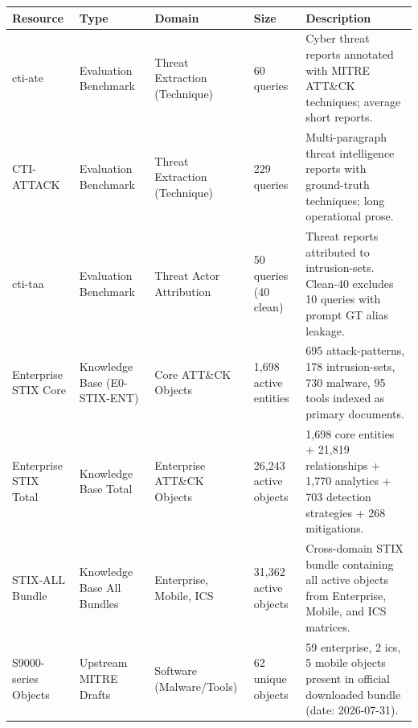 \begin{tabular}{lllll}
\toprule
Resource & Type & Domain & Size & Description \\
\midrule
cti-ate & Evaluation Benchmark & Threat Extraction (Technique) & 60 queries & Cyber threat reports annotated with MITRE ATT\&CK techniques; average short reports. \\
CTI-ATTACK & Evaluation Benchmark & Threat Extraction (Technique) & 229 queries & Multi-paragraph threat intelligence reports with ground-truth techniques; long operational prose. \\
cti-taa & Evaluation Benchmark & Threat Actor Attribution & 50 queries (40 clean) & Threat reports attributed to intrusion-sets. Clean-40 excludes 10 queries with prompt GT alias leakage. \\
Enterprise STIX Core & Knowledge Base (E0-STIX-ENT) & Core ATT\&CK Objects & 1,698 active entities & 695 attack-patterns, 178 intrusion-sets, 730 malware, 95 tools indexed as primary documents. \\
Enterprise STIX Total & Knowledge Base Total & Enterprise ATT\&CK Objects & 26,243 active objects & 1,698 core entities + 21,819 relationships + 1,770 analytics + 703 detection strategies + 268 mitigations. \\
STIX-ALL Bundle & Knowledge Base All Bundles & Enterprise, Mobile, ICS & 31,362 active objects & Cross-domain STIX bundle containing all active objects from Enterprise, Mobile, and ICS matrices. \\
S9000-series Objects & Upstream MITRE Drafts & Software (Malware/Tools) & 62 unique objects & 59 enterprise, 2 ics, 5 mobile objects present in official downloaded bundle (date: 2026-07-31). \\
\bottomrule
\end{tabular}
